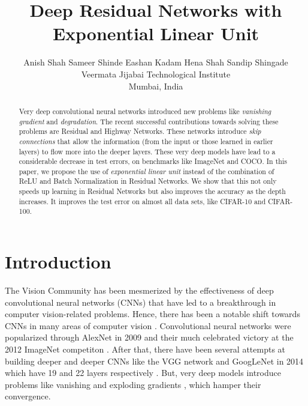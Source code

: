 \documentclass[10pt,twocolumn,letterpaper]{article}
\begin{document}
\title{Deep Residual Networks with Exponential Linear Unit}

\author{Anish Shah \qquad Sameer Shinde \qquad Eashan Kadam \qquad Hena Shah \qquad Sandip Shingade\\
Veermata Jijabai Technological Institute\\
Mumbai, India\\
}

\maketitle

\begin{abstract}
    Very deep convolutional neural networks introduced new 
    problems like \emph{vanishing gradient} and \emph{degradation}.
    The recent successful contributions towards solving these problems are Residual and Highway Networks.
    These networks introduce \emph{skip connections} that allow the information (from the input or those learned in earlier layers) to flow more into the deeper layers.
    These very deep models have lead to a considerable decrease in test errors, on benchmarks like ImageNet and COCO.
    In this paper, we propose the use of \emph{exponential linear unit} instead of the combination of ReLU and Batch Normalization in Residual Networks.
    We show that this not only speeds up learning in Residual Networks but also improves the accuracy as the depth increases. 
    It improves the test error on almost all data sets, like CIFAR-10 and CIFAR-100.
\end{abstract}

\section{Introduction}

The Vision Community has been mesmerized by the effectiveness of deep convolutional neural networks (CNNs) \cite{[13]} that have led to a breakthrough in computer vision-related problems. Hence, there has been a notable shift towards CNNs in many areas of computer vision \cite{[12], [14], [15], [16], [17]}. Convolutional neural networks were popularized through AlexNet \cite{[10]} in 2009 and their much celebrated victory at the 2012 ImageNet competiton \cite{[11],[12]}. After that, there have been several attempts at building deeper and deeper CNNs like the VGG network and GoogLeNet in 2014 which have 19 and 22 layers respectively \cite{[15], [17]}. But, very deep models introduce problems like vanishing and exploding gradients \cite{[3]}, which hamper their convergence. 
\end{document}
